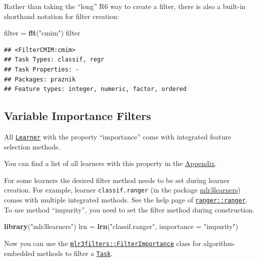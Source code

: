 \documentclass[]{scrbook}
\newenvironment{Shaded}{\begin{snugshade}}{\end{snugshade}}
\newcommand{\DataTypeTok}[1]{\textcolor[rgb]{0.13,0.29,0.53}{#1}}
\newcommand{\KeywordTok}[1]{\textcolor[rgb]{0.13,0.29,0.53}{\textbf{#1}}}
\newcommand{\NormalTok}[1]{#1}
\newcommand{\StringTok}[1]{\textcolor[rgb]{0.31,0.60,0.02}{#1}}
\renewenvironment{Shaded} {\begin{snugshade}\small} {\end{snugshade}}
\begin{document}
Rather than taking the ``long'' R6 way to create a filter, there is also a built-in shorthand notation for filter creation:

\begin{Shaded}
\begin{Highlighting}[]
\NormalTok{filter =}\StringTok{ }\KeywordTok{flt}\NormalTok{(}\StringTok{"cmim"}\NormalTok{)}
\NormalTok{filter}
\end{Highlighting}
\end{Shaded}

\begin{verbatim}
## <FilterCMIM:cmim>
## Task Types: classif, regr
## Task Properties: -
## Packages: praznik
## Feature types: integer, numeric, factor, ordered
\end{verbatim}

\hypertarget{fs-var-imp-filters}{%
\subsection{Variable Importance Filters}\label{fs-var-imp-filters}}

All \href{https://mlr3.mlr-org.com/reference/Learner.html}{\texttt{Learner}} with the property ``importance'' come with integrated feature selection methods.

You can find a list of all learners with this property in the \protect\hyperlink{fs-filter-embedded-list}{Appendix}.

For some learners the desired filter method needs to be set during learner creation.
For example, learner \texttt{classif.ranger} (in the package \href{https://mlr3learners.mlr-org.com}{mlr3learners}) comes with multiple integrated methods.
See the help page of \href{https://www.rdocumentation.org/packages/ranger/topics/ranger}{\texttt{ranger::ranger}}.
To use method ``impurity'', you need to set the filter method during construction.

\begin{Shaded}
\begin{Highlighting}[]
\KeywordTok{library}\NormalTok{(}\StringTok{"mlr3learners"}\NormalTok{)}
\NormalTok{lrn =}\StringTok{ }\KeywordTok{lrn}\NormalTok{(}\StringTok{"classif.ranger"}\NormalTok{, }\DataTypeTok{importance =} \StringTok{"impurity"}\NormalTok{)}
\end{Highlighting}
\end{Shaded}

Now you can use the \href{https://mlr3filters.mlr-org.com/reference/FilterImportance.html}{\texttt{mlr3filters::FilterImportance}} class for algorithm-embedded methods to filter a \href{https://mlr3.mlr-org.com/reference/Task.html}{\texttt{Task}}.
\end{document}
